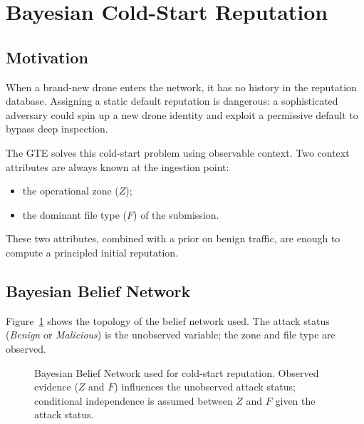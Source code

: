 \documentclass[12pt, a4paper]{report}
\begin{document}
\section{Bayesian Cold-Start Reputation}
\label{sec:gte-bayes}

\subsection{Motivation}

When a brand-new drone enters the network, it has no history in the
reputation database. Assigning a static default reputation is dangerous:
a sophisticated adversary could spin up a new drone identity and exploit
a permissive default to bypass deep inspection.

The GTE solves this cold-start problem using observable context. Two
context attributes are always known at the ingestion point:
\begin{itemize}
    \item the operational zone ($Z$);
    \item the dominant file type ($F$) of the submission.
\end{itemize}

These two attributes, combined with a prior on benign traffic, are
enough to compute a principled initial reputation.

\subsection{Bayesian Belief Network}

Figure~\ref{fig:bbn-topology} shows the topology of the belief network
used. The attack status (\emph{Benign} or \emph{Malicious}) is the
unobserved variable; the zone and file type are observed.

\begin{figure}[H]
\centering
{}
\caption{Bayesian Belief Network used for cold-start reputation.
Observed evidence ($Z$ and $F$) influences the unobserved attack status;
conditional independence is assumed between $Z$ and $F$ given the attack
status.}
\label{fig:bbn-topology}
\end{figure}
\end{document}
